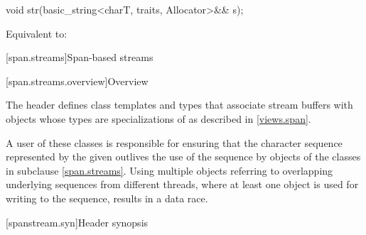 %
\begin{itemdecl}
void str(basic_string<charT, traits, Allocator>&& s);
\end{itemdecl}

\begin{itemdescr}
\pnum
\effects
Equivalent to: 
\end{itemdescr}

[span.streams]{Span-based streams}

[span.streams.overview]{Overview}

\pnum
The header  defines class templates and types
that associate stream buffers with objects whose types are
specializations of  as described in \ref{views.span}.
\begin{note}
A user of these classes is responsible for ensuring
that the character sequence represented by the given 
outlives the use of the sequence by objects of the classes in subclause \ref{span.streams}.
Using multiple  objects
referring to overlapping underlying sequences from different threads,
where at least one  object is used
for writing to the sequence,
results in a data race.
\end{note}

[spanstream.syn]{Header  synopsis}

